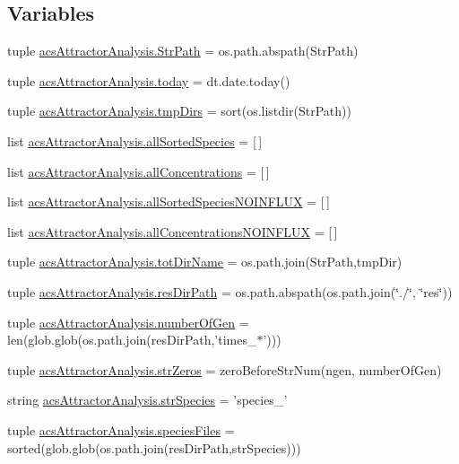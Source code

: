\subsection*{Variables}
\begin{DoxyCompactItemize}
\item 
tuple \hyperlink{a00096_a60fb7d39ab8835d4b764461220e796e2}{acs\-Attractor\-Analysis.\-Str\-Path} = os.\-path.\-abspath(Str\-Path)
\item 
tuple \hyperlink{a00096_a71bc5e3d205016fb7893b438e75be78e}{acs\-Attractor\-Analysis.\-today} = dt.\-date.\-today()
\item 
tuple \hyperlink{a00096_ac88c3245a42ebefee3fcf90626f6eaf4}{acs\-Attractor\-Analysis.\-tmp\-Dirs} = sort(os.\-listdir(Str\-Path))
\item 
list \hyperlink{a00096_aafc595063b7c4b74f94c0931ff2370a5}{acs\-Attractor\-Analysis.\-all\-Sorted\-Species} = \mbox{[}$\,$\mbox{]}
\item 
list \hyperlink{a00096_ae708f0b0e671f432735f039e1ff6b6ca}{acs\-Attractor\-Analysis.\-all\-Concentrations} = \mbox{[}$\,$\mbox{]}
\item 
list \hyperlink{a00096_a02a8db664a67956bc698b79f7c31a7bd}{acs\-Attractor\-Analysis.\-all\-Sorted\-Species\-N\-O\-I\-N\-F\-L\-U\-X} = \mbox{[}$\,$\mbox{]}
\item 
list \hyperlink{a00096_acda16f4751633455ab19e92bdc5baf2a}{acs\-Attractor\-Analysis.\-all\-Concentrations\-N\-O\-I\-N\-F\-L\-U\-X} = \mbox{[}$\,$\mbox{]}
\item 
tuple \hyperlink{a00096_ad3caf9c42727aaab24f4ea4dae362fc9}{acs\-Attractor\-Analysis.\-tot\-Dir\-Name} = os.\-path.\-join(Str\-Path,tmp\-Dir)
\item 
tuple \hyperlink{a00096_a35eb3b681c7408f1476b92798d4f2c16}{acs\-Attractor\-Analysis.\-res\-Dir\-Path} = os.\-path.\-abspath(os.\-path.\-join(\char`\"{}./\char`\"{}, \char`\"{}res\char`\"{}))
\item 
tuple \hyperlink{a00096_ac014a9b46a060e4fed96eaee9614345b}{acs\-Attractor\-Analysis.\-number\-Of\-Gen} = len(glob.\-glob(os.\-path.\-join(res\-Dir\-Path,'times\-\_\-$\ast$')))
\item 
tuple \hyperlink{a00096_a5708d1d44920d75a918ec1c988c02c57}{acs\-Attractor\-Analysis.\-str\-Zeros} = zero\-Before\-Str\-Num(ngen, number\-Of\-Gen)
\item 
string \hyperlink{a00096_aa76707ba3058ba96fc8e5aeafa461193}{acs\-Attractor\-Analysis.\-str\-Species} = 'species\-\_\-'
\item 
tuple \hyperlink{a00096_a670249d163388a9d93c8f3b9fb63afac}{acs\-Attractor\-Analysis.\-species\-Files} = sorted(glob.\-glob(os.\-path.\-join(res\-Dir\-Path,str\-Species)))

\end{DoxyCompactItemize}
